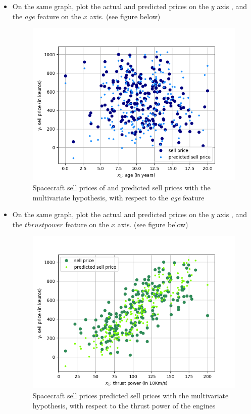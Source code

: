 \documentclass{42-en}
\begin{document}
\begin{itemize}
  \item On the same graph, plot the actual and predicted prices on the $y$ axis , and the $age$ feature on the $x$ axis. (see figure below)
  \begin{figure}[!h]
    \centering
    \includegraphics[scale=0.6]{assets/ex07_price_vs_age_part2.png}
    \caption{Spacecraft sell prices of and predicted sell prices  with the multivariate hypothesis, with respect to the \textit{age} feature}
  \end{figure}
  
  \item On the same graph, plot the actual and predicted prices on the $y$ axis , and the $thrust power$ feature on the $x$ axis. (see figure below)
  \begin{figure}[!h]
    \centering
    \includegraphics[scale=0.6]{assets/ex07_price_vs_thrust_part2.png}
    \caption{Spacecraft sell prices predicted sell prices with the multivariate hypothesis, with respect to the thrust power of the engines}
  \end{figure}
  

\end{itemize}
\end{document}
